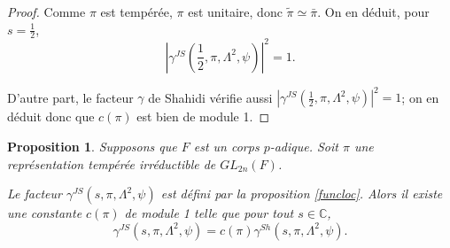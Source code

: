 \documentclass{amsart}
\newtheorem{proposition}{Proposition}[section]
\begin{document}
\begin{proof}
 Comme $\pi$ est tempérée, $\pi$ est unitaire, donc $\tilde{\pi} \simeq \bar{\pi}$. On en déduit, pour $s = \frac{1}{2}$,
 \begin{equation}
 |\gamma^{JS}(\frac{1}{2}, \pi, \Lambda^2, \psi)|^2=1.
 \end{equation}
 
 D'autre part, le facteur $\gamma$ de Shahidi vérifie aussi $|\gamma^{JS}(\frac{1}{2}, \pi, \Lambda^2, \psi)|^2=1$; on en déduit donc que $c(\pi)$ est bien de module 1.
 \end{proof}
 
 \begin{proposition}
 Supposons que $F$ est un corps $p$-adique. Soit $\pi$ une représentation tempérée irréductible de $GL_{2n}(F)$. 
 
 Le facteur $\gamma^{JS}(s,\pi,\Lambda^2,\psi)$ est défini par la proposition \ref{funcloc}. Alors il existe une constante $c(\pi)$ de module 1 telle que pour tout $s \in \mathbb{C}$,
 \begin{equation}
 \gamma^{JS}(s, \pi, \Lambda^2, \psi) = c(\pi)\gamma^{Sh}(s, \pi, \Lambda^2, \psi).
 \end{equation}
 \end{proposition}
 
\end{document}

